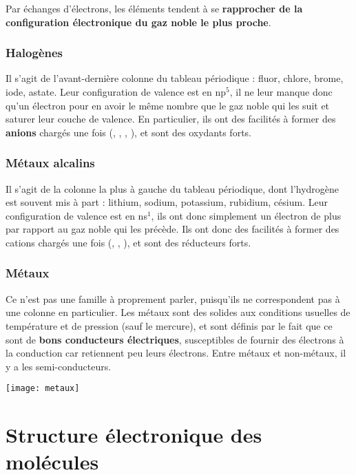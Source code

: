 \documentclass[../main/main.tex]{subfiles}
\begin{document}
Par échanges d'électrons, les éléments tendent à se \textbf{rapprocher de la
configuration électronique du gaz noble le plus proche}.

\subsubsection{Halogènes}
Il s'agit de l'avant-dernière colonne du tableau périodique : fluor, chlore,
brome, iode, astate. Leur configuration de valence est en np$^5$, il ne leur
manque donc qu'un électron pour en avoir le même nombre que le gaz noble qui les
suit et saturer leur couche de valence. En particulier, ils ont des facilités à
former des \textbf{anions} chargés une fois (, , ,
), et sont des oxydants forts.

\subsubsection{Métaux alcalins}
Il s'agit de la colonne la plus à gauche du tableau périodique, dont l'hydrogène
est souvent mis à part : lithium, sodium, potassium, rubidium, césium. Leur
configuration de valence est en ns$^1$, ils ont donc simplement un électron de
plus par rapport au gaz noble qui les précède. Ils ont donc des facilités à
former des cations chargés une fois (, , ), et sont des
réducteurs forts.

\subsubsection{Métaux}

Ce n'est pas une famille à proprement parler, puisqu'ils ne correspondent pas à
une colonne en particulier. Les métaux sont des solides aux conditions usuelles
de température et de pression (sauf le mercure), et sont définis par le fait que
ce sont de \textbf{bons conducteurs électriques}, susceptibles de fournir des
électrons à la conduction car retiennent peu leurs électrons. Entre métaux et
non-métaux, il y a les semi-conducteurs.

\begin{center}
    \texttt{[image: metaux]}
\end{center}

\section{Structure électronique des molécules}
\end{document}

